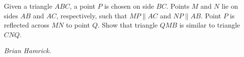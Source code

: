 Given a triangle $ABC$, a point $P$ is chosen on side $BC$. Points $M$ and $N$ lie on sides $AB$ and $AC$, respectively, such that $MP \parallel AC$ and $NP \parallel AB$. Point $P$ is reflected across $MN$ to point $Q$. Show that triangle $QMB$ is similar to triangle $CNQ$.

\textit{Brian Hamrick.}